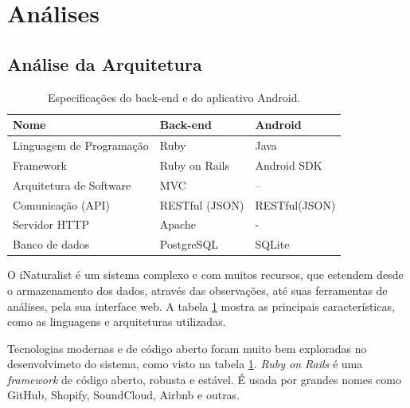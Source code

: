 \section{Análises}
\subsection{Análise da Arquitetura}

\begin{table}[h!]
  \centering
  \begin{tabular}{lll}
    \toprule
    \textbf{Nome}                  & \textbf{Back-end} & \textbf{Android} \\
    \midrule
    Linguagem de Programação       & Ruby              & Java             \\
    Framework                      & Ruby on Rails     & Android SDK      \\
    Arquitetura de Software        & MVC               & --               \\
    Comunicação (API)\footnotemark & RESTful (JSON)    & RESTful(JSON)    \\
    Servidor HTTP                  & Apache            & -                \\
    Banco de dados                 & PostgreSQL        & SQLite           \\
    \bottomrule
  \end{tabular}

  \caption{Especificações do back-end e do aplicativo Android.}
  \label{tab:back-end-espec}
\end{table}


O iNaturalist é um sistema complexo e com muitos recursos, que estendem desde o armazenamento dos dados, através das observações, até suas ferramentas de análises, pela sua interface web. A tabela \ref{tab:back-end-espec} mostra as principais características, como as linguagens e arquiteturas utilizadas.

Tecnologias modernas e de código aberto foram muito bem exploradas no desenvolvimeto do sistema, como visto na tabela \ref{tab:back-end-espec}. \emph{Ruby on Rails} é uma \emph{framework} de código aberto, robusta e estável. É usada por grandes nomes como GitHub, Shopify, SoundCloud, Airbnb e outras.


